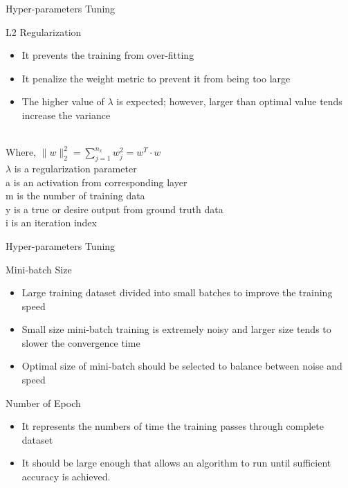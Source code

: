\documentclass[10pt]{beamer}
\begin{document}
\begin{frame}{Hyper-parameters Tuning}

\begin{block}{L2 Regularization}
    
    \begin{itemize}
        \item It prevents the training from over-fitting 
        \item It penalize the weight metric to prevent it from being too large
        \item The higher value of $\lambda$ is expected; however, larger than optimal value tends increase the variance  
    \end{itemize}
    \vspace{15pt}
    \\
    \vspace{5pt}
    \hspace{30pt}
    Where, $\|w\|_{2}^{2}=\sum_{j=1}^{n_{x}} w_{j}^{2}=w^{T} \cdot w$ \\ 
           $\lambda$ is a regularization parameter \\ 
           a is an activation from corresponding layer\\ 
           m is the number of training data \\
           y is a true or desire output from ground truth data \\
           i is an iteration index
\end{block}       
\end{frame}

\begin{frame}{Hyper-parameters Tuning}
    \begin{block}{Mini-batch Size}
        \begin{itemize}
            \item Large training dataset divided into small batches to improve the training speed
            \item Small size mini-batch training is extremely noisy and larger size tends to slower the convergence time
            \item Optimal size of mini-batch should be selected to balance between noise and speed
        \end{itemize}
    \end{block}
    
    \begin{block}{Number of Epoch}
        \begin{itemize}
            \item It represents the numbers of time the training passes through complete dataset
            \item It should be large enough that allows an algorithm to run until sufficient accuracy is achieved.
        \end{itemize}
    \end{block}
\end{frame}
\end{document}
